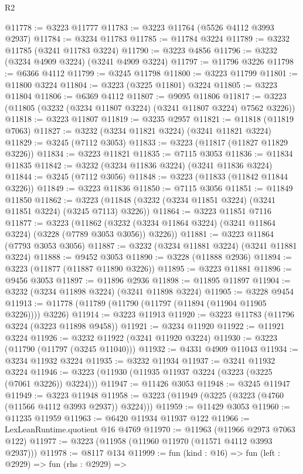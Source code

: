 \begin{lexlean}{R2}
\begin{coremodule}
@11778 := @3223 @11777
@11783 := @3223 @11764 (@5526 @4112 @3993 @2937)
@11784 := @3234 @11783
@11785 := @11784 @3224
@11789 := @3232 @11785 (@3241 @11783 @3224)
@11790 := @3223 @4856
@11796 := @3232 (@3234 @4909 @3224) (@3241 @4909 @3224)
@11797 := @11796 @3226
@11798 := @6366 @4112
@11799 := @3245 @11798
@11800 := @3223 @11799
@11801 := @11800 @3224
@11804 := @3223 (@3225 @11801) @3224
@11805 := @3223 @11804
@11806 := @6369 @4112
@11807 := @9095 @11806
@11817 := @3223 (@11805 (@3232 (@3234 @11807 @3224) (@3241 @11807 @3224) @7562 @3226))
@11818 := @3223 @11807
@11819 := @3235 @2957
@11821 := @11818 (@11819 @7063)
@11827 := @3232 (@3234 @11821 @3224) (@3241 @11821 @3224)
@11829 := @3245 (@7112 @3053)
@11833 := @3223 (@11817 (@11827 @11829 @3226))
@11834 := @3223 @11821
@11835 := @7115 @3053
@11836 := @11834 @11835
@11842 := @3232 (@3234 @11836 @3224) (@3241 @11836 @3224)
@11844 := @3245 (@7112 @3056)
@11848 := @3223 (@11833 (@11842 @11844 @3226))
@11849 := @3223 @11836
@11850 := @7115 @3056
@11851 := @11849 @11850
@11862 := @3223 (@11848 (@3232 (@3234 @11851 @3224) (@3241 @11851 @3224) (@3245 @7113) @3226))
@11864 := @3223 @11851 @7116
@11877 := @3223
    (@11862 (@3232 (@3234 @11864 @3224) (@3241 @11864 @3224) (@3228 (@7789 @3053 @3056)) @3226))
@11881 := @3223 @11864 (@7793 @3053 @3056)
@11887 := @3232 (@3234 @11881 @3224) (@3241 @11881 @3224)
@11888 := @9452 @3053
@11890 := @3228 (@11888 @2936)
@11894 := @3223 (@11877 (@11887 @11890 @3226))
@11895 := @3223 @11881
@11896 := @9456 @3053
@11897 := @11896 @2936
@11898 := @11895 @11897
@11904 := @3232 (@3234 @11898 @3224) (@3241 @11898 @3224)
@11905 := @3228 @9454
@11913 := @11778 (@11789 (@11790 (@11797 (@11894 (@11904 @11905 @3226)))) @3226)
@11914 := @3223 @11913
@11920 := @3223 @11783 (@11796 @3224 (@3223 @11898 @9458))
@11921 := @3234 @11920
@11922 := @11921 @3224
@11926 := @3232 @11922 (@3241 @11920 @3224)
@11930 := @3223 (@11790 (@11797 (@3245 @11040)))
@11932 := @4331 @4909 @11043
@11934 := @3234 @11932 @3224
@11935 := @3232 @11934
@11937 := @3241 @11932 @3224
@11946 := @3223 (@11930 (@11935 @11937 @3224 (@3223 (@3225 (@7061 @3226)) @3224)))
@11947 := @11426 @3053
@11948 := @3245 @11947
@11949 := @3223 @11948
@11958 := @3223 (@11949 (@3225 (@3223 (@4760 (@11566 @4112 @3993 @2937)) @3224)))
@11959 := @11429 @3053
@11960 := @11235 @11959
@11963 := @6420 @11934 @11937 @122
@11966 := LexLeanRuntime.quotient @16 @4769
@11970 := @11963 (@11966 @2973 @7063 @122)
@11977 := @3223 (@11958 (@11960 @11970 (@11571 @4112 @3993 @2937)))
@11978 := @8117 @134
@11999 := fun (kind : @16) =>
  fun (left : @2929) =>
  fun (rhs : @2929) =>

\end{coremodule}
\end{lexlean}
